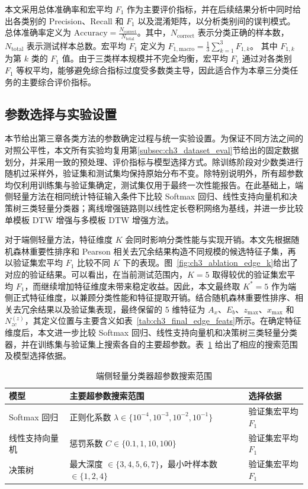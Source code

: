 \documentclass{xdupgthesis}
\providecommand{\FloatBarrier}{}
\begin{document}
本文采用总体准确率和宏平均 $F_1$ 作为主要评价指标，并在后续结果分析中同时给出各类别的 Precision、Recall 和 $F_1$ 以及混淆矩阵，以分析类别间的误判模式。总体准确率定义为 $\mathrm{Accuracy}=\frac{N_{\mathrm{correct}}}{N_{\mathrm{total}}}$。其中，$N_{\mathrm{correct}}$ 表示分类正确的样本数，$N_{\mathrm{total}}$ 表示测试样本总数。宏平均 $F_1$ 定义为 $F_{1,\mathrm{macro}}=\frac{1}{3}\sum_{k=1}^{3}F_{1,k}$。
其中 $F_{1,k}$ 为第 $k$ 类的 $F_1$ 值。由于三类样本规模并不完全均衡，宏平均 $F_1$ 通过对各类别 $F_1$ 等权平均，能够避免综合指标过度受多数类主导，因此适合作为本章三分类任务的主要综合评价指标。

\FloatBarrier

\subsection{参数选择与实验设置}
\label{subsec:ch3_param_setup}

本节给出第三章各类方法的参数确定过程与统一实验设置。为保证不同方法之间的对照公平性，本文所有实验均复用第\ref{subsec:ch3_dataset_eval}节给出的固定数据划分，并采用一致的预处理、评价指标与模型选择方式。除训练阶段对少数类进行随机过采样外，验证集和测试集均保持原始分布不变。除特别说明外，所有超参数均仅利用训练集与验证集确定，测试集仅用于最终一次性能报告。在此基础上，端侧轻量方法在相同统计特征输入条件下比较 Softmax 回归、线性支持向量机和决策树三类轻量分类器；离线增强链路则以线性定长卷积网络为基线，并进一步比较单模板 DTW 增强与多模板 DTW 增强方法。

对于端侧轻量方法，特征维度 $K$ 会同时影响分类性能与实现开销。本文先根据随机森林重要性排序和 Pearson 相关去冗余结果构造不同规模的候选特征子集，再以验证集宏平均 $F_1$ 比较不同 $K$ 下的表现。图~\ref{fig:ch3_ablation_edge_k}给出了对应的验证结果。可以看出，在当前测试范围内，$K=5$ 取得较优的验证集宏平均 $F_1$，而继续增加特征维度未带来稳定收益。因此，本文最终取 $K^\ast=5$ 作为端侧正式特征维度，以兼顾分类性能和特征提取开销。结合随机森林重要性排序、相关去冗余结果以及验证集表现，最终保留的 5 维特征为 $A_x$、$E_b$、$z_{\max}$、$x_{\max}$ 和 $N_{zc}^{(z)}$，其定义位置与主要含义如表~\ref{tab:ch3_final_edge_feats}所示。在确定特征维度后，本文进一步比较 Softmax 回归、线性支持向量机和决策树三类轻量分类器，并在训练集与验证集上搜索各自的主要超参数。表~\ref{tab:ch3_edge_hyper} 给出了相应的搜索范围及模型选择依据。

\begin{table}[!htbp]
\centering
\small
\caption{端侧轻量分类器超参数搜索范围}
\label{tab:ch3_edge_hyper}
\setlength{\tabcolsep}{6pt}
\renewcommand{\arraystretch}{1.15}
\begin{tabular}{p{2.8cm} p{7.6cm} p{2.6cm}}
\hline
模型 & 主要超参数搜索范围 & 选择依据 \\
\hline
Softmax 回归 & 正则化系数 $\lambda\in\{10^{-4},10^{-3},10^{-2},10^{-1}\}$ & 验证集宏平均 $F_1$ \\
线性支持向量机 & 惩罚系数 $C\in\{0.1,1,10,100\}$ & 验证集宏平均 $F_1$ \\
决策树 & 最大深度 $\in\{3,4,5,6,7\}$，最小叶样本数 $\in\{1,2,4\}$ & 验证集宏平均 $F_1$ \\
\hline
\end{tabular}
\end{table}
\end{document}
